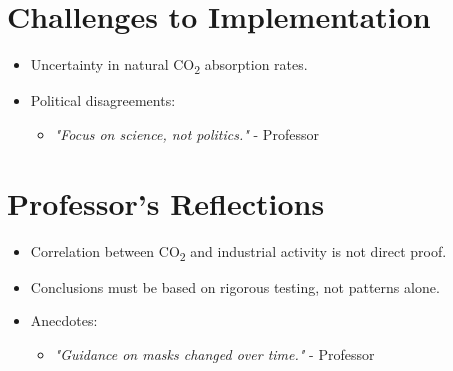 \documentclass[12pt]{article}
\begin{document}
\section*{Challenges to Implementation}
\begin{itemize}
    \item Uncertainty in natural CO\textsubscript{2} absorption rates.
    \item Political disagreements:
    \begin{itemize}
        \item \textit{"Focus on science, not politics."} - Professor
    \end{itemize}
\end{itemize}

\section*{Professor's Reflections}
\begin{itemize}
    \item Correlation between CO\textsubscript{2} and industrial activity is not direct proof.
    \item Conclusions must be based on rigorous testing, not patterns alone.
    \item Anecdotes:
    \begin{itemize}
        \item \textit{"Guidance on masks changed over time."} - Professor
    \end{itemize}
\end{itemize}
\end{document}
